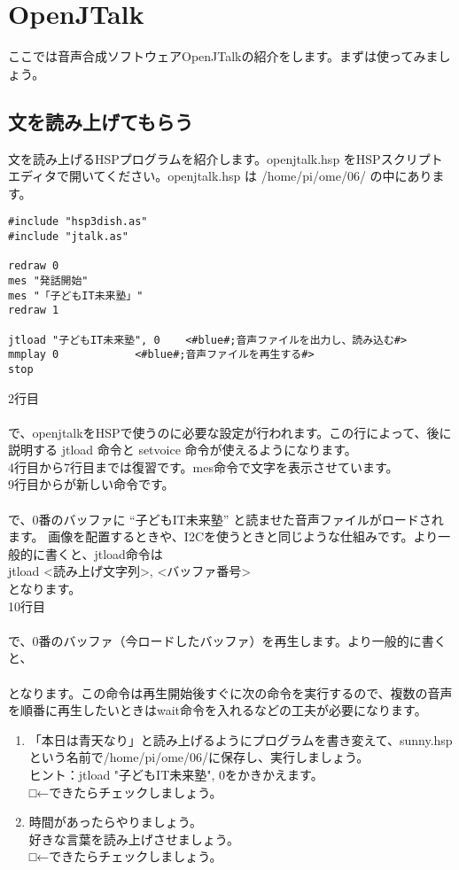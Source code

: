 \section{OpenJTalk}
ここでは音声合成ソフトウェアOpenJTalkの紹介をします。まずは使ってみましょう。
\subsection{文を読み上げてもらう}
文を読み上げるHSPプログラムを紹介します。openjtalk.hsp をHSPスクリプトエディタで開いてください。openjtalk.hsp は /home/pi/ome/06/ の中にあります。\\

\begin{lstlisting}[caption=openjtalk.hsp,label=openjtalk.hsp]
#include "hsp3dish.as"
#include "jtalk.as"

redraw 0
mes "発話開始"
mes "「子どもIT未来塾」"
redraw 1

jtload "子どもIT未来塾", 0	<#blue#;音声ファイルを出力し、読み込む#>
mmplay 0			<#blue#;音声ファイルを再生する#>
stop
\end{lstlisting}

2行目\\
\\
で、openjtalkをHSPで使うのに必要な設定が行われます。この行によって、後に説明する jtload 命令と setvoice 命令が使えるようになります。\\
4行目から7行目までは復習です。mes命令で文字を表示させています。\\
9行目からが新しい命令です。\\
\\
で、0番のバッファに “子どもIT未来塾” と読ませた音声ファイルがロードされます。 画像を配置するときや、I2Cを使うときと同じような仕組みです。より一般的に書くと、jtload命令は\\
jtload <読み上げ文字列>, <バッファ番号>\\
となります。\\
10行目\\
\\
で、0番のバッファ（今ロードしたバッファ）を再生します。より一般的に書くと、\\
\\
となります。この命令は再生開始後すぐに次の命令を実行するので、複数の音声を順番に再生したいときはwait命令を入れるなどの工夫が必要になります。\\

\begin{tcolorbox}[title=\useOmetoi]
\begin{enumerate}
\item 「本日は青天なり」と読み上げるようにプログラムを書き変えて、sunny.hspという名前で/home/pi/ome/06/に保存し、実行しましょう。\\ヒント：jtload "子どもIT未来塾", 0をかきかえます。\\□←できたらチェックしましょう。
\item 時間があったらやりましょう。\\好きな言葉を読み上げさせましょう。\\□←できたらチェックしましょう。
\end{enumerate}
\end{tcolorbox}